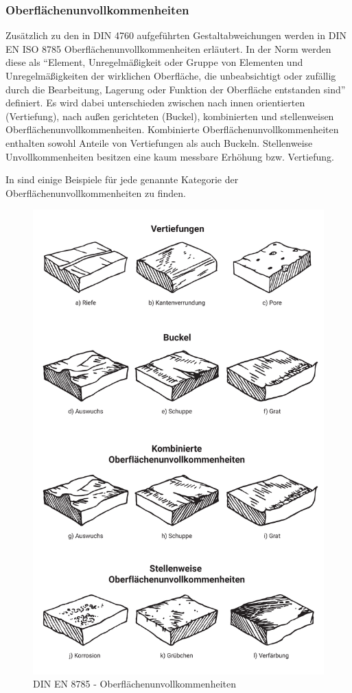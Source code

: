 \subsubsection{Oberflächenunvollkommenheiten}

Zusätzlich zu den in DIN 4760 aufgeführten Gestaltabweichungen werden in DIN EN ISO 8785 Oberflächenunvollkommenheiten erläutert. In der Norm werden diese als "`Element, Unregelmäßigkeit oder Gruppe von Elementen und Unregelmäßigkeiten der wirklichen Oberfläche, die unbeabsichtigt oder zufällig durch die Bearbeitung, Lagerung oder Funktion der Oberfläche entstanden sind"' definiert. Es wird dabei unterschieden zwischen nach innen orientierten (Vertiefung), nach außen gerichteten (Buckel), kombinierten und stellenweisen Oberflächenunvollkommenheiten. Kombinierte Oberflächenunvollkommenheiten enthalten sowohl Anteile von Vertiefungen als auch Buckeln. Stellenweise Unvollkommenheiten besitzen eine kaum messbare Erhöhung bzw. Vertiefung. 

In  sind einige Beispiele für jede genannte Kategorie der Oberflächenunvollkommenheiten zu finden. 

\begin{figure}[h]
	\centering
	\includegraphics[width=0.7\linewidth]{img/din_en_8785_beispiele}
	\caption[DIN EN 8785 - Oberflächenunvollkommenheiten]{DIN EN 8785 - Oberflächenunvollkommenheiten}
	\label{fig:din-en-8785-beispiele}
\end{figure}









 






          


